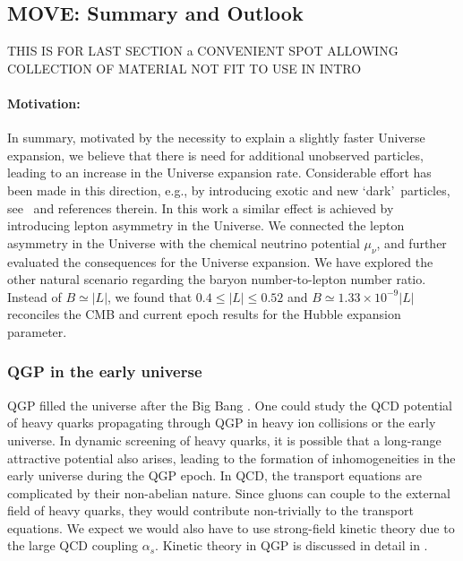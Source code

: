 \subsection{MOVE: Summary and Outlook}
\label{sec:SummOut}
THIS IS FOR LAST SECTION a CONVENIENT SPOT ALLOWING COLLECTION OF MATERIAL NOT FIT TO USE IN INTRO


\paragraph{Motivation:}
In summary, motivated by the necessity to explain a slightly faster Universe expansion, we believe that there is need for additional unobserved particles,  leading to an increase  in the Universe expansion rate. Considerable effort has been made in this direction, e.g., by introducing exotic and new \lq dark\rq\ particles, see~\cite{Birrell:2014cja} and references therein. In this work a similar effect is achieved by introducing lepton asymmetry in the Universe. We connected the lepton asymmetry in the Universe with the chemical neutrino potential $\mu_\nu$,
and further evaluated the consequences for the Universe expansion. We have explored the other natural scenario regarding the baryon number-to-lepton number ratio. Instead of $B\simeq |L|$, we found that $0.4\leqslant|L| \leqslant0.52$ and $B\simeq 1.33\times 10^{-9}|L|$ reconciles the CMB and current epoch results for the Hubble expansion parameter.

\subsubsection{QGP in the early universe}
 QGP filled the universe after the Big Bang \cite{Rafelski:2013yka}. One could study the QCD potential of heavy quarks propagating through QGP in heavy ion collisions or the early universe. In dynamic screening of heavy quarks, it is possible that a long-range attractive potential also arises, leading to the formation of inhomogeneities in the early universe during the QGP epoch. In QCD, the transport equations are complicated by their non-abelian nature. Since gluons can couple to the external field of heavy quarks, they would contribute non-trivially to the transport equations. We expect we would also have to use strong-field kinetic theory due to the large QCD coupling $\alpha_s$. Kinetic theory in QGP is discussed in detail in \cite{Mrowczynski:2016etf}.

